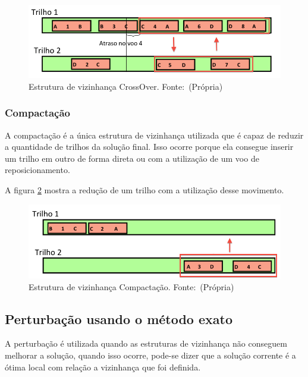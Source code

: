 \begin{figure}[ht]
	\caption{Estrutura de vizinhança CrossOver. \newline \mbox{Fonte:
	(Própria)}}\label{fig:crossover}
	\includegraphics[scale=0.4]{./img/crossover}
	
\end{figure}
 
 \subsubsection{Compactação}
 
A compactação é a única estrutura de vizinhança utilizada que é capaz de
reduzir a quantidade de trilhos da solução final. Isso ocorre porque ela
consegue inserir um trilho em outro de forma direta ou com a utilização de um
voo de reposicionamento.
 
A figura \ref{fig:compactacao} mostra a redução de um trilho com a utilização
desse movimento.

\begin{figure}[ht] 
	\caption{Estrutura de vizinhança Compactação. \newline \mbox{Fonte:
	(Própria)}}\label{fig:compactacao}
	\includegraphics[scale=0.4]{./img/compactacao}
	
\end{figure}
 
 \subsection{Perturbação usando o método exato}
   
A perturbação é utilizada quando as estruturas de vizinhança não
conseguem melhorar a solução, quando isso ocorre, pode-se dizer que a
solução corrente é a ótima local com relação a vizinhança que foi definida.
 
